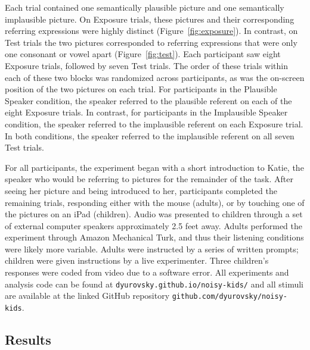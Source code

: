\documentclass[man,floatsintext]{apa6}
\begin{document}
Each trial contained one semantically plausible picture and one semantically implausible picture. On Exposure trials, these pictures and their corresponding referring expressions were highly distinct (Figure~\ref{fig:exposure}). In contrast, on Test trials the two pictures corresponded to referring expressions that were only one consonant or vowel apart (Figure~\ref{fig:test}). Each participant saw eight Exposure trials, followed by seven Test trials. The order of these trials within each of these two blocks was randomized across participants, as was the on-screen position of the two pictures on each trial. For participants in the Plausible Speaker condition, the speaker referred to the plausible referent on each of the eight Exposure trials. In contrast, for participants in the Implausible Speaker condition, the speaker referred to the implausible referent on each Exposure trial. In both conditions, the speaker referred to the implausible referent on all seven Test trials.

For all participants, the experiment began with a short introduction to Katie, the speaker who would be referring to pictures for the remainder of the task. After seeing her picture and being introduced to her, participants completed the remaining trials, responding either with the mouse (adults), or by touching one of the pictures on an iPad (children). Audio was presented to children through a set of external computer speakers approximately 2.5 feet away. Adults performed the experiment through Amazon Mechanical Turk, and thus their listening conditions were likely more variable. Adults were instructed by a series of written prompts; children were given instructions by a live experimenter. Three children's responses were coded from video due to a software error. All experiments and analysis code can be found at {\small \tt{dyurovsky.github.io/noisy-kids/}} and all stimuli are available at the linked GitHub repository {\small \tt{github.com/dyurovsky/noisy-kids}}.

\subsection{Results}
\end{document}
